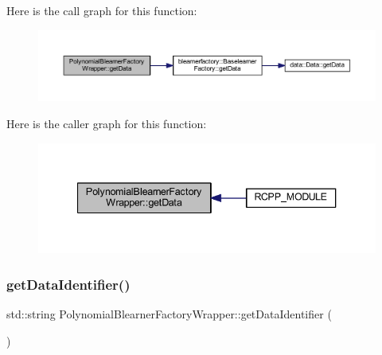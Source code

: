 Here is the call graph for this function\+:
\nopagebreak
\begin{figure}[H]
\begin{center}
\leavevmode
\includegraphics[width=350pt]{class_polynomial_blearner_factory_wrapper_a7949c6384e31e69033cfe0cd96ea9746_cgraph}
\end{center}
\end{figure}
Here is the caller graph for this function\+:\nopagebreak
\begin{figure}[H]
\begin{center}
\leavevmode
\includegraphics[width=340pt]{class_polynomial_blearner_factory_wrapper_a7949c6384e31e69033cfe0cd96ea9746_icgraph}
\end{center}
\end{figure}
\mbox{\label{class_polynomial_blearner_factory_wrapper_a1711f3a9554faf63a03bf625fe39491a}} 
\subsubsection{\texorpdfstring{get\+Data\+Identifier()}{getDataIdentifier()}}
{\footnotesize\ttfamily std\+::string Polynomial\+Blearner\+Factory\+Wrapper\+::get\+Data\+Identifier (\begin{DoxyParamCaption}{ }\end{DoxyParamCaption})\hspace{0.3cm}{\ttfamily [inline]}}


